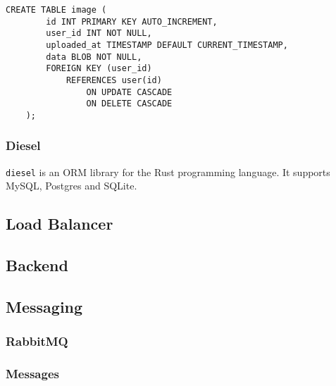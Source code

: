 \documentclass[../documentation.tex]{subfiles}
\begin{document}
\begin{lstlisting}[style=sql]
    CREATE TABLE image (
        id INT PRIMARY KEY AUTO_INCREMENT,
        user_id INT NOT NULL,
        uploaded_at TIMESTAMP DEFAULT CURRENT_TIMESTAMP,
        data BLOB NOT NULL,
        FOREIGN KEY (user_id)
            REFERENCES user(id)
                ON UPDATE CASCADE
                ON DELETE CASCADE
    );
\end{lstlisting}

\subsubsection{Diesel}

\texttt{diesel} is an ORM library for the Rust programming language.
It supports MySQL, Postgres and SQLite.

\subsection{Load Balancer}

\subsection{Backend}

\subsection{Messaging}

\subsubsection{RabbitMQ}

\subsubsection{Messages}

\newcommand{\tline}{
    \\ \hline
}

\newcommand{\packetstruct}[1]{
    \bgroup{}
    \def\arraystretch{1.25}
        \begin{tabular}{|l|l|l|}
            \hline
            \textbf{Field} & \textbf{Type} & \textbf{Description}
            \tline
            
            \if\relax\detokenize{#1}\relax
            \else
                #1
                \tline
            \fi
        \end{tabular}
    \egroup{}
}
\end{document}
